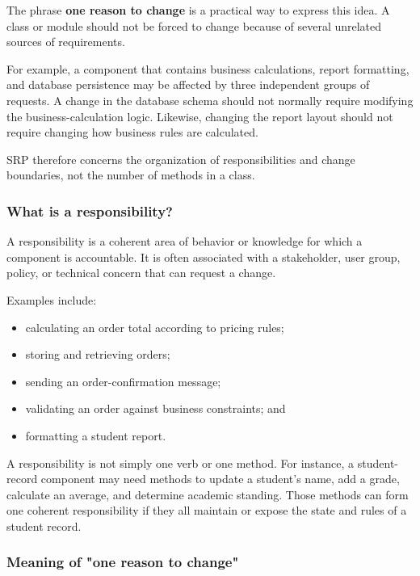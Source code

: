 \documentclass[12pt,a4paper]{article}
\begin{document}
The phrase \textbf{one reason to change} is a practical way to express this idea. A class or module should not be forced to change because of several unrelated sources of requirements.

For example, a component that contains business calculations, report formatting, and database persistence may be affected by three independent groups of requests. A change in the database schema should not normally require modifying the business-calculation logic. Likewise, changing the report layout should not require changing how business rules are calculated.

SRP therefore concerns the organization of responsibilities and change boundaries, not the number of methods in a class.

\subsubsection{What is a responsibility?}

A responsibility is a coherent area of behavior or knowledge for which a component is accountable. It is often associated with a stakeholder, user group, policy, or technical concern that can request a change.

Examples include:

\begin{itemize}

\item calculating an order total according to pricing rules;

\item storing and retrieving orders;

\item sending an order-confirmation message;

\item validating an order against business constraints; and

\item formatting a student report.

\end{itemize}

A responsibility is not simply one verb or one method. For instance, a student-record component may need methods to update a student's name, add a grade, calculate an average, and determine academic standing. Those methods can form one coherent responsibility if they all maintain or expose the state and rules of a student record.

\subsubsection{Meaning of "one reason to change"}
\end{document}
